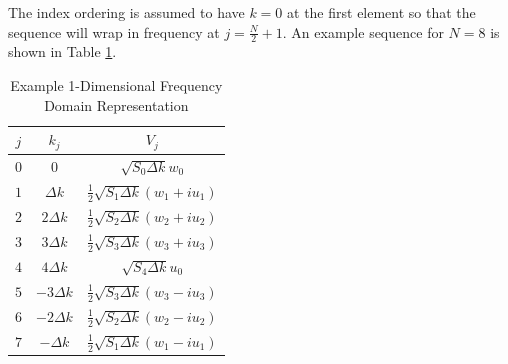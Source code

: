 The index ordering is assumed to have $k=0$ at the first element so that the sequence will wrap in frequency at $j = \frac{N}{2} + 1$. An example sequence for $N = 8$ is shown in Table \ref{os_tab:2a}.
\begin{table}[H]
  \begin{center}
      \renewcommand{\baselinestretch}{1} \small\normalsize
  \begin{quote}
    \caption[Example 1-Dimensional Frequency Domain Representation]{Example 1-Dimensional Frequency Domain Representation\label{os_tab:2a}}
  \end{quote}
  \begin{tabular} {| c | c | c |}
    \hline
  \bf{$j$} & \bf{$k_j$} & \bf{$V_j$} \\ \hline
  $0$ & $0$ & $\sqrt{S_{0} \Delta k}w_0$ \\ \hline
  $1$ & $\Delta k$ & $\frac{1}{2}\sqrt{S_1 \Delta k} \left(w_1 + iu_1 \right)$ \\ \hline
  $2$ & $2\Delta k$ & $\frac{1}{2}\sqrt{S_2\Delta k} \left(w_2 + iu_2 \right)$ \\ \hline
  $3$ & $3\Delta k$ & $\frac{1}{2}\sqrt{S_3 \Delta k} \left(w_3 + iu_3 \right)$ \\ \hline
  $4$ & $4\Delta k$ & $\sqrt{S_{4} \Delta k} u_0$ \\ \hline
  $5$ & $-3\Delta k$ & $\frac{1}{2}\sqrt{S_3 \Delta k} \left(w_3 - iu_3 \right)$ \\ \hline
  $6$ & $-2\Delta k$ & $\frac{1}{2}\sqrt{S_2 \Delta k} \left(w_2 - iu_2 \right)$  \\ \hline
  $7$ & $-\Delta k$ & $\frac{1}{2}\sqrt{S_1 \Delta k} \left(w_1 - iu_1 \right)$ \\ \hline
\end{tabular}
\end{center}
\end{table}
\renewcommand{\baselinestretch}{2} \small\normalsize

